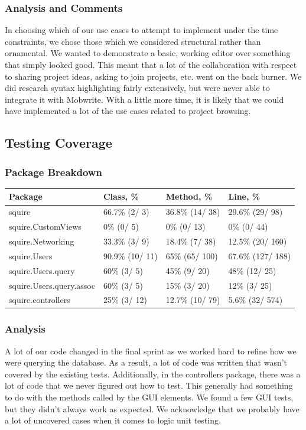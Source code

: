 \documentclass[twoside,letterpaper]{article}
\begin{document}
\subsubsection{Analysis and Comments}
In choosing which of our use cases to attempt to implement under the time constraints, we chose those which we considered structural rather than ornamental. We wanted to demonstrate a basic, working editor over something that simply looked good. This meant that a lot of the collaboration with respect to sharing project ideas, asking to join projects, etc. went on the back burner. We did research syntax highlighting fairly extensively, but were never able to integrate it with Mobwrite. With a little more time, it is likely that we could have implemented a lot of the use cases related to project browsing.

\subsection{Testing Coverage}

\subsubsection{Package Breakdown}
\begin{tabular}{|l|l|l|l|}
\hline
Package                  & Class, \%       & Method, \%      & Line, \%          \\ \hline
squire                   & 66.7\% (2/ 3)   & 36.8\% (14/ 38) & 29.6\% (29/ 98)   \\ \hline
squire.CustomViews       & 0\% (0/ 5)      & 0\% (0/ 13)     & 0\% (0/ 44)       \\ \hline
squire.Networking        & 33.3\% (3/ 9)   & 18.4\% (7/ 38)  & 12.5\% (20/ 160)  \\ \hline
squire.Users             & 90.9\% (10/ 11) & 65\% (65/ 100)  & 67.6\% (127/ 188) \\ \hline
squire.Users.query       & 60\% (3/ 5)     & 45\% (9/ 20)    & 48\% (12/ 25)     \\ \hline
squire.Users.query.assoc & 60\% (3/ 5)     & 15\% (3/ 20)    & 12\% (3/ 25)      \\ \hline
squire.controllers       & 25\% (3/ 12)    & 12.7\% (10/ 79) & 5.6\% (32/ 574)   \\ \hline
\end{tabular}

\subsubsection{Analysis}
A lot of our code changed in the final sprint as we worked hard to refine how we were querying the database. As a result, a lot of code was written that wasn't covered by the existing tests. Additionally, in the controllers package, there was a lot of code that we never figured out how to test. This generally had something to do with the methods called by the GUI elements. We found a few GUI tests, but they didn't always work as expected. We acknowledge that we probably have a lot of uncovered cases when it comes to logic unit testing.
\end{document}
